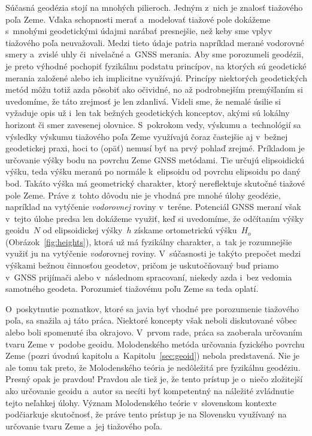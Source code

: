 \documentclass[a4paper, 12pt]{book}
\begin{document}
Súčasná geodézia stojí na mnohých pilieroch.  Jedným z~nich je znalosť 
tiažového poľa Zeme.  Vďaka schopnosti merať a~modelovať tiažové pole dokážeme 
s~mnohými geodetickými údajmi narábať presnejšie, než keby sme vplyv tiažového 
poľa neuvažovali.  Medzi tieto údaje patria napríklad merané vodorovné smery 
a~zvislé uhly či~nivelačné a~GNSS merania.  Aby sme porozumeli geodézii, je 
preto výhodné pochopiť fyzikálnu podstatu princípov, na ktorých sú geodetické 
merania založené alebo ich implicitne využívajú.  Princípy niektorých 
geodetických metód môžu totiž azda pôsobiť ako očividné, no až podrobnejším 
premýšľaním si uvedomíme, že táto zrejmosť je len zdanlivá.  Videli sme, že 
nemalé úsilie si vyžaduje opis už i~len tak bežných geodetických konceptov, 
akými sú lokálny horizont či smer zavesenej olovnice.  S~pokrokom vedy, výskumu 
a~technológií sa výsledky výskumu tiažového poľa Zeme využívajú čoraz častejšie 
aj v~bežnej geodetickej praxi, hoci to (opäť) nemusí byť na prvý pohlaď zrejmé.  
Príkladom je určovanie výšky bodu na povrchu Zeme GNSS metódami.  Tie určujú 
elipsoidickú výšku, teda výšku meranú po normále k~elipsoidu od povrchu 
elipsoidu po daný bod.  Takáto výška má geometrický charakter, ktorý 
nereflektuje skutočné tiažové pole Zeme.  Práve z~tohto dôvodu nie je vhodná 
pre mnohé úlohy geodézie, napríklad na vytýčenie \emph{vodorovnej} roviny 
v~teréne.  Potenciál GNSS meraní však v~tejto úlohe predsa len dokážeme využiť, 
keď si uvedomíme, že odčítaním výšky geoidu~$N$ od elipsoidickej výšky~$h$ 
získame ortometrickú výšku~$H_o$ (Obrázok~\ref{fig:heights}), ktorá už má 
fyzikálny charakter, a~tak je rozumnejšie využiť ju na vytýčenie 
\emph{vodo}rovnej roviny.  V~súčasnosti je takýto prepočet medzi výškami bežnou 
činnosťou geodetov, pričom je uskutočňovaný buď priamo v~GNSS prijímači alebo 
v~následnom spracovaní, niekedy azda i~bez vedomia samotného geodeta.  
Porozumieť tiažovému poľu Zeme sa teda oplatí.

O~poskytnutie poznatkov, ktoré sa javia byť vhodné pre porozumenie tiažového 
poľa, sa snažila aj táto práca.  Niektoré koncepty však neboli diskutované 
vôbec alebo boli spomenuté iba okrajovo.  V~prvom rade, práca sa zaoberala 
určovaním tvaru Zeme v~podobe geoidu.  Molodenského metóda určovania fyzického 
povrchu Zeme (pozri úvodnú kapitolu a~Kapitolu~\ref{sec:geoid}) nebola 
predstavená.  Nie je ale tomu tak preto, že Molodenského teória je nedôležitá 
pre fyzikálnu geodéziu.  Presný opak je pravdou!  Pravdou ale tiež je, že tento 
prístup je o~niečo zložitejší ako určovanie geoidu a~autor sa necíti byť 
kompetentný na náležité zvládnutie tejto neľahkej úlohy.  Význam Molodenského 
teórie v~slovenskom kontexte podčiarkuje skutočnosť, že práve tento prístup je 
na Slovensku využívaný na určovanie tvaru Zeme a~jej tiažového poľa.
\end{document}
